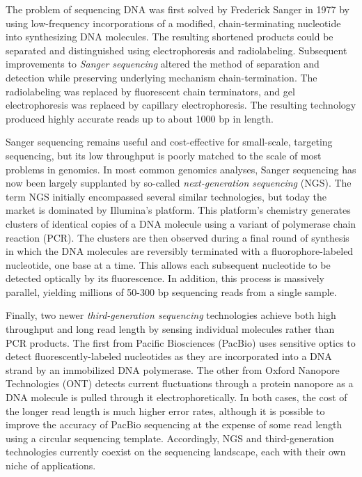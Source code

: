 \documentclass[11pt]{ucthesis}
\begin{document}
The problem of sequencing DNA was first solved by Frederick Sanger in 1977 by using low-frequency incorporations of a modified, chain-terminating nucleotide into synthesizing DNA molecules\cite{sanger1977dna}. The resulting shortened products could be separated and distinguished using electrophoresis and radiolabeling. Subsequent improvements to \emph{Sanger sequencing} altered the method of separation and detection while preserving underlying mechanism chain-termination. The radiolabeling was replaced by fluorescent chain terminators, and gel electrophoresis was replaced by capillary electrophoresis\cite{smith1986fluorescence}. The resulting technology produced highly accurate reads up to about 1000 bp in length. 
 
Sanger sequencing remains useful and cost-effective for small-scale, targeting sequencing, but its low throughput is poorly matched to the scale of most problems in genomics. In most common genomics analyses, Sanger sequencing has now been largely supplanted by so-called \emph{next-generation sequencing} (NGS)\cite{metzker2010sequencing}. The term NGS initially encompassed several similar technologies, but today the market is dominated by Illumina's platform. This platform's chemistry generates clusters of identical copies of a DNA molecule using a variant of polymerase chain reaction (PCR). The clusters are then observed during a final round of synthesis in which the DNA molecules are reversibly terminated with a fluorophore-labeled nucleotide, one base at a time. This allows each subsequent nucleotide to be detected optically by its fluorescence. In addition, this process is massively parallel, yielding millions of 50-300 bp sequencing reads from a single sample. 

Finally, two newer \emph{third-generation sequencing} technologies achieve both high throughput and long read length by sensing individual molecules rather than PCR products. The first from Pacific Biosciences (PacBio) uses sensitive optics to detect fluorescently-labeled nucleotides as they are incorporated into a DNA strand by an immobilized DNA polymerase\cite{eid2009real}. The other from Oxford Nanopore Technologies (ONT) detects current fluctuations through a protein nanopore as a DNA molecule is pulled through it electrophoretically\cite{mikheyev2014first}. In both cases, the cost of the longer read length is much higher error rates, although it is possible to improve the accuracy of PacBio sequencing at the expense of some read length using a circular sequencing template\cite{wenger2019accurate}. Accordingly, NGS and third-generation technologies currently coexist on the sequencing landscape, each with their own niche of applications.
 
\end{document}
